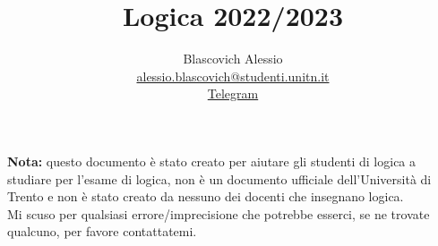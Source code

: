 \documentclass{book}
\title{Logica 2022/2023}
\author{Blascovich Alessio\\
    \href{mailto:alessio.blascovich@studenti.unitn.it}{alessio.blascovich@studenti.unitn.it}\\
    \href{https://t.me/alessio_blascovich}{Telegram}
}
\date{}
\begin{document}
    \maketitle
    \textbf{Nota:} questo documento è stato creato per aiutare gli studenti di logica a studiare per l'esame di logica, non è un documento ufficiale dell'Università di Trento e non è stato creato da nessuno dei docenti che insegnano logica.\\
    Mi scuso per qualsiasi errore/imprecisione che potrebbe esserci, se ne trovate qualcuno, per favore contattatemi.
    \tableofcontents
    

    

    

    
\end{document}
